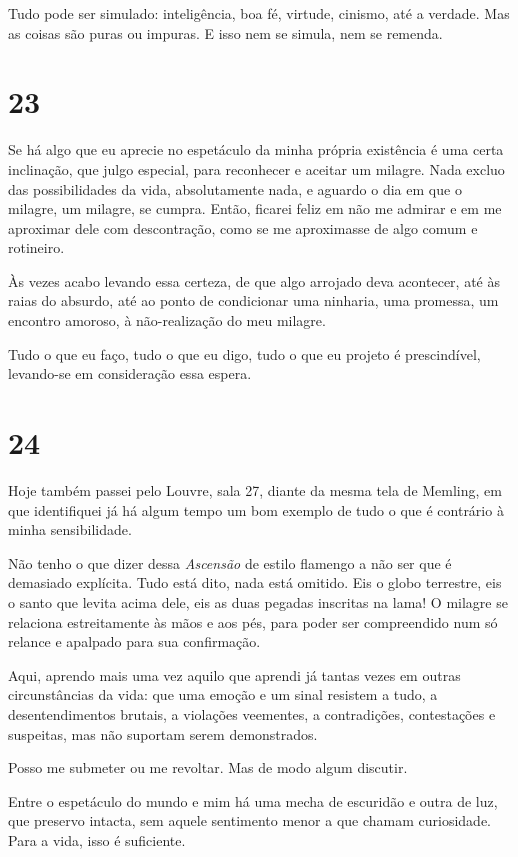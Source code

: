 Tudo pode ser simulado: inteligência, boa fé, virtude, cinismo, até a
verdade. Mas as coisas são puras ou impuras. E isso nem se simula, nem
se remenda.

\section{23}

Se há algo que eu aprecie no espetáculo da minha própria existência é
uma certa inclinação, que julgo especial, para reconhecer e aceitar um
milagre. Nada excluo das possibilidades da vida, absolutamente nada, e
aguardo o dia em que o milagre, um milagre, se cumpra. Então, ficarei
feliz em não me admirar e em me aproximar dele com descontração, como se
me aproximasse de algo comum e rotineiro.

Às vezes acabo levando essa certeza, de que algo arrojado deva
acontecer, até às raias do absurdo, até ao ponto de condicionar uma
ninharia, uma promessa, um encontro amoroso, à não-realização do meu
milagre.

Tudo o que eu faço, tudo o que eu digo, tudo o que eu projeto é
prescindível, levando-se em consideração essa espera.

\section{24}

Hoje também passei pelo Louvre, sala 27, diante da mesma tela de
Memling, em que identifiquei já há algum tempo um bom exemplo de tudo o
que é contrário à minha sensibilidade.

Não tenho o que dizer dessa \emph{Ascensão} de estilo flamengo a não ser
que é demasiado explícita. Tudo está dito, nada está omitido. Eis o
globo terrestre, eis o santo que levita acima dele, eis as duas pegadas
inscritas na lama! O milagre se relaciona estreitamente às mãos e aos
pés, para poder ser compreendido num só relance e apalpado para sua
confirmação.

Aqui, aprendo mais uma vez aquilo que aprendi já tantas vezes em outras
circunstâncias da vida: que uma emoção e um sinal resistem a tudo, a
desentendimentos brutais, a violações veementes, a contradições,
contestações e suspeitas, mas não suportam serem demonstrados.

Posso me submeter ou me revoltar. Mas de modo algum discutir.

Entre o espetáculo do mundo e mim há uma mecha de escuridão e outra de
luz, que preservo intacta, sem aquele sentimento menor a que chamam
curiosidade. Para a vida, isso é suficiente.
